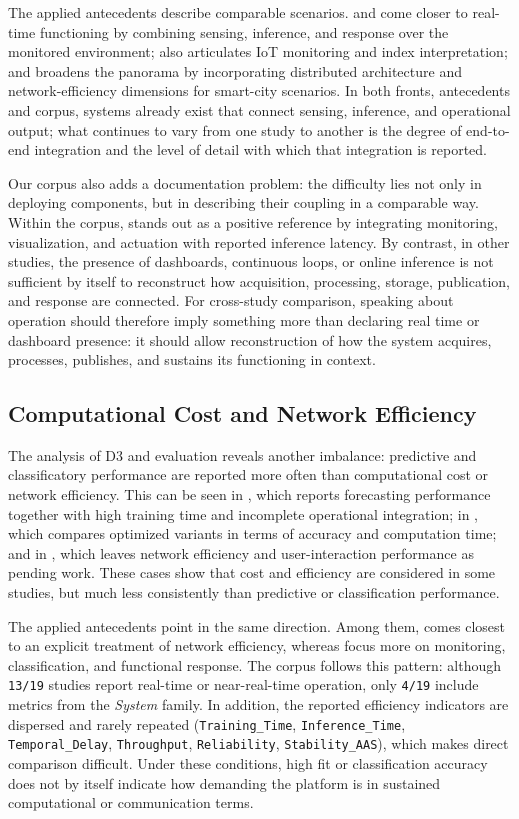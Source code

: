 The applied antecedents describe comparable scenarios. \cite{ART05} and \cite{ART07} come closer to real-time functioning by combining sensing, inference, and response over the monitored environment; \cite{ART06} also articulates IoT monitoring and index interpretation; and \cite{ART08} broadens the panorama by incorporating distributed architecture and network-efficiency dimensions for smart-city scenarios. In both fronts, antecedents and corpus, systems already exist that connect sensing, inference, and operational output; what continues to vary from one study to another is the degree of end-to-end integration and the level of detail with which that integration is reported.

Our corpus also adds a documentation problem: the difficulty lies not only in deploying components, but in describing their coupling in a comparable way. Within the corpus, \cite{A114} stands out as a positive reference by integrating monitoring, visualization, and actuation with reported inference latency. By contrast, in other studies, the presence of dashboards, continuous loops, or online inference is not sufficient by itself to reconstruct how acquisition, processing, storage, publication, and response are connected. For cross-study comparison, speaking about operation should therefore imply something more than declaring real time or dashboard presence: it should allow reconstruction of how the system acquires, processes, publishes, and sustains its functioning in context.

\subsection{Computational Cost and Network Efficiency}
The analysis of D3 and evaluation reveals another imbalance: predictive and classificatory performance are reported more often than computational cost or network efficiency. This can be seen in \cite{A135}, which reports forecasting performance together with high training time and incomplete operational integration; in \cite{A138}, which compares optimized variants in terms of accuracy and computation time; and in \cite{A178}, which leaves network efficiency and user-interaction performance as pending work. These cases show that cost and efficiency are considered in some studies, but much less consistently than predictive or classification performance.

The applied antecedents point in the same direction. Among them, \cite{ART08} comes closest to an explicit treatment of network efficiency, whereas \cite{ART05,ART06,ART07} focus more on monitoring, classification, and functional response. The corpus follows this pattern: although \texttt{13/19} studies report real-time or near-real-time operation, only \texttt{4/19} include metrics from the \textit{System} family. In addition, the reported efficiency indicators are dispersed and rarely repeated (\texttt{Training\_Time}, \texttt{Inference\_Time}, \texttt{Temporal\_Delay}, \texttt{Throughput}, \texttt{Reliability}, \texttt{Stability\_AAS}), which makes direct comparison difficult. Under these conditions, high fit or classification accuracy does not by itself indicate how demanding the platform is in sustained computational or communication terms.

